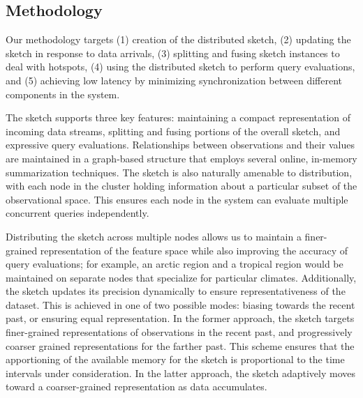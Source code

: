 \subsection{Methodology}
Our methodology targets (1) creation of the distributed sketch, (2) updating the sketch in response to data arrivals, (3) splitting and fusing sketch instances to deal with hotspots, (4) using the distributed sketch to perform query evaluations, and (5) achieving low latency by minimizing synchronization between different components in the system. 

The sketch supports three key features: maintaining a compact representation of incoming data streams, splitting and fusing portions of the overall sketch, and expressive query evaluations. Relationships between observations and their values are maintained in a graph-based structure that employs several online, in-memory summarization techniques. The sketch is also naturally amenable to distribution, with each node in the cluster holding information about a particular subset of the observational space.  This ensures each node in the system can evaluate multiple concurrent queries independently.

Distributing the sketch across multiple nodes allows us to maintain a finer-grained representation of the feature space while also improving the accuracy of query evaluations; for example, an arctic region and a tropical region would be maintained on separate nodes that specialize for particular climates. Additionally, the sketch updates its precision dynamically to ensure representativeness of the dataset. This is achieved in one of two possible modes: biasing towards the recent past, or ensuring equal representation. In the former approach, the sketch targets finer-grained representations of observations in the recent past, and progressively coarser grained representations for the farther past. This scheme ensures that the apportioning of the available memory for the sketch is proportional to the time intervals under consideration.  In the latter approach, the sketch adaptively moves toward a coarser-grained representation as data accumulates.


